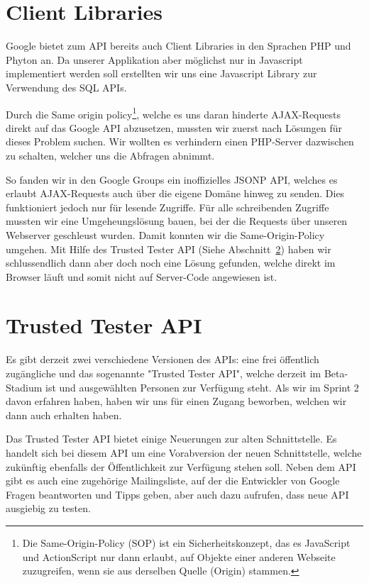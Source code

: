\section{Client Libraries}
Google bietet zum API bereits auch Client Libraries in den Sprachen PHP und Phyton an. Da unserer Applikation aber möglichst nur in Javascript implementiert werden soll erstellten wir uns eine Javascript Library zur Verwendung des SQL APIs.

Durch die Same origin policy\footnote{Die Same-Origin-Policy (SOP) ist ein Sicherheitskonzept, das es JavaScript und ActionScript nur dann erlaubt, auf Objekte einer anderen Webseite zuzugreifen, wenn sie aus derselben Quelle (Origin) stammen.\cite{sop} }, welche es uns daran hinderte AJAX-Requests direkt auf das Google API abzusetzen, mussten wir zuerst nach Lösungen für dieses Problem suchen. Wir wollten es verhindern einen PHP-Server dazwischen zu schalten, welcher uns die Abfragen abnimmt.

So fanden wir in den Google Groups ein inoffizielles JSONP API, welches es erlaubt AJAX-Requests auch über die eigene Domäne hinweg zu senden. Dies funktioniert jedoch nur für lesende Zugriffe. Für alle schreibenden Zugriffe mussten wir eine Umgeheungslösung bauen, bei der die Requests über unseren Webserver geschleust wurden. Damit konnten wir die Same-Origin-Policy umgehen. Mit Hilfe des Trusted Tester API (Siehe Abschnitt~\ref{trusted-tester-api}) haben wir schlussendlich dann aber doch noch eine Lösung gefunden, welche direkt im Browser läuft und somit nicht auf Server-Code angewiesen ist.

\section{Trusted Tester API}
\label{trusted-tester-api}
Es gibt derzeit zwei verschiedene Versionen des APIs: eine frei öffentlich zugängliche und das sogenannte "Trusted Tester API", welche derzeit im Beta-Stadium ist und ausgewählten Personen zur Verfügung steht. Als wir im Sprint 2 davon erfahren haben, haben wir uns für einen Zugang beworben, welchen wir dann auch erhalten haben.

Das Trusted Tester API bietet einige Neuerungen zur alten Schnittstelle. Es handelt sich bei diesem API um eine Vorabversion der neuen Schnittstelle, welche zukünftig ebenfalls der Öffentlichkeit zur Verfügung stehen soll. Neben dem API gibt es auch eine zugehörige Mailingsliste, auf der die Entwickler von Google Fragen beantworten und Tipps geben, aber auch dazu aufrufen, dass neue API ausgiebig zu testen.

